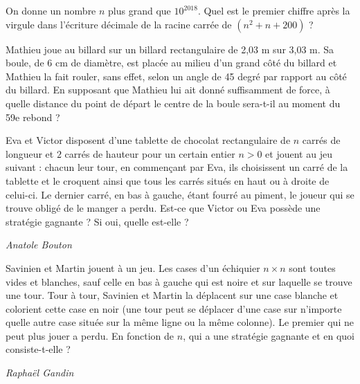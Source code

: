 \begin{exo}{}
On donne un nombre $n$ plus grand que $10^{2018}$.
Quel est le premier chiffre après la virgule dans l’écriture décimale de la racine carrée de $(n^2 +n+200)$ ?
 \end{exo}

\begin{exo}{}

Mathieu joue au billard sur un billard rectangulaire de
2,03 m sur 3,03 m. Sa boule, de 6 cm de diamètre, est
placée au milieu d’un grand côté du billard et Mathieu la
fait rouler, sans effet, selon un angle de 45 degré par rapport
au côté du billard.
En supposant que Mathieu lui ait donné suffisamment
de force, à quelle distance du point de départ le centre
de la boule sera-t-il au moment du 59e rebond ?

\end{exo}



\begin{exo}{}
Eva et Victor disposent d'une tablette de chocolat rectangulaire de $n$ carrés de longueur et $2$ carrés de hauteur pour un certain entier $n>0$ et jouent au jeu suivant : chacun leur tour, en commençant par Eva, ils choisissent un carré de la tablette et le croquent ainsi que tous les carrés situés en haut ou à droite de celui-ci. Le dernier carré, en bas à gauche, étant fourré au piment, le joueur qui se trouve obligé de le manger a perdu. Est-ce que Victor ou Eva possède une stratégie gagnante ? Si oui, quelle est-elle ?

\medskip
\textit{Anatole Bouton}
\end{exo}




\begin{exo}{}
Savinien et Martin jouent à un jeu. Les cases d'un échiquier $n\times n$ sont toutes vides et blanches, sauf celle en bas à gauche qui est noire et sur laquelle se trouve une tour. Tour à tour, Savinien et Martin la déplacent sur une case blanche et colorient cette case en noir (une tour peut se déplacer d'une case sur n'importe quelle autre case située sur la même ligne ou la même colonne). Le premier qui ne peut plus jouer a perdu. En fonction de $n$, qui a une stratégie gagnante et en quoi consiste-t-elle ?%

\medskip
\textit{Raphaël Gandin}
\end{exo}

